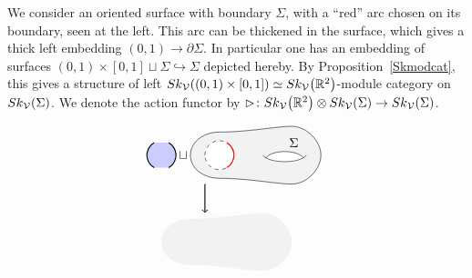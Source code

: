 \documentclass[11pt]{article}
\numberwithin{equation}{section}
\numberwithin{equation}{section}
\begin{document}
\begin{Definition}\label{defLeftActSkR2}
We consider an oriented surface with boundary $\Sigma$, with a ``red'' arc chosen on its boundary, seen at the left. This arc can be thickened in the surface, which gives a thick left embedding $(0,1) \to\partial \Sigma$. In particular one has an embedding of surfaces $(0,1)\times[0,1]\sqcup\Sigma \hookrightarrow \Sigma$ depicted hereby. By Proposition~\ref{Skmodcat}, this gives a structure of left ${\rm Sk}_\mathcal{V}((0,1)\times[0,1]) \simeq {\rm Sk}_\mathcal{V}\big(\mathbb{R}^2\big)$-module category on~${\rm Sk}_\mathcal{V}(\Sigma)$. We denote the action functor by \mbox{$\rhd\colon{\rm Sk}_\mathcal{V}\big(\mathbb{R}^2\big) \otimes {\rm Sk}_\mathcal{V}(\Sigma) \to {\rm Sk}_\mathcal{V}(\Sigma)$}.
\end{Definition}
$$
\begin{tikzpicture}[yscale = 0.8, xscale = -0.8]
\fill[gray!10] (4.5,1) .. controls (4.5,0.5) and (4,0.2) .. (3.5,0.2)	.. controls (2.5,0.2) and (1.5,0 ) .. (1,0)	.. controls (0.5,0 ) and (0,0.5 ) .. (0,1)	.. controls (0,1.5 ) and (0.5,2 ) .. (1,2)	.. controls (1.5,2 ) and (2.5,1.8) .. (3.5,1.8) .. controls (4,1.8) and (4.5,1.5) .. (4.5,1) -- cycle ;
\fill[white] (0.6,0.9) .. controls (0.7,0.7) and (1.8,0.7) .. (1.9,0.9) .. controls (1.7,1.2) and (0.8,1.2) .. (0.6,0.9);
\fill[white] (3.5,1) circle(0.5);
\draw[dashed] (3.5,1) circle(0.5);
\draw[thick, red] (240:0.5)++(3.5,1) arc(240:120:0.5);
\draw (0.5,1) .. controls (0.7,0.7) and (1.8,0.7) .. (2,1);
\draw (0.6,0.9) .. controls (0.8,1.2) and (1.7,1.2) .. (1.9,0.9) node[midway, above right]{$\Sigma$};
\draw (4.5,1) .. controls (4.5,0.5) and (4,0.2) .. (3.5,0.2)	.. controls (2.5,0.2) and (1.5,0 ) .. (1,0)	.. controls (0.5,0 ) and (0,0.5 ) .. (0,1)	.. controls (0,1.5 ) and (0.5,2 ) .. (1,2)	.. controls (1.5,2 ) and (2.5,1.8) .. (3.5,1.8) .. controls (4,1.8) and (4.5,1.5) .. (4.5,1);
\node (sq) at (4.75,1){$\sqcup$}; \draw[->, thick] (4,0) -- ++(0,-1) node[midway, right]{};
\fill[blue!20](240:0.5)++(5.5,1) arc(240:120:0.5) -- ++(0.5,0) arc(60:-60:0.5) -- ++(-0.5,0);
\draw[thick] (240:0.5)++(5.5,1) arc(240:120:0.5);
\draw[thick] (-60:0.5)++(5.5,1) arc(-60:60:0.5);
\begin{scope}[yshift = -3cm, xshift = 1cm]
\fill[gray!10] (4.5,1) .. controls (4.5,0.5) and (4,0.2) .. (3.5,0.2)	.. controls (2.5,0.2) and (1.5,0 ) .. (1,0)	.. controls (0.5,0 ) and (0,0.5 ) .. (0,1)	.. controls (0,1.5 ) and (0.5,2 ) .. (1,2)	.. controls (1.5,2 ) and (2.5,1.8) .. (3.5,1.8) .. controls (4,1.8) and (4.5,1.5) .. (4.5,1) -- cycle ;

\end{scope}
\end{tikzpicture}$$
\end{document}
